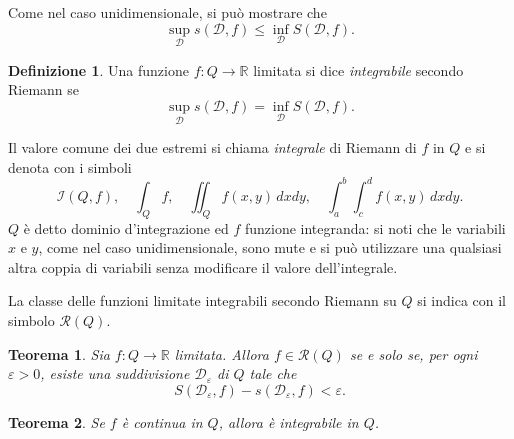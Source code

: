 \documentclass[a4paper]{book}
\numberwithin{equation}{section}
\renewcommand{\epsilon}{\varepsilon}
\theoremstyle{plain}
\newtheorem{teor}{Teorema}[section]
\theoremstyle{definition}
\newtheorem{defn}{Definizione}[section]
\theoremstyle{remark}
\theoremstyle{example}
\begin{document}
Come nel caso unidimensionale, si può mostrare che
	\begin{equation*}
	\sup_{\mathcal{D}} s(\mathcal{D}, f) \le \inf_{\mathcal{D}} S(\mathcal{D}, f).
	\end{equation*}

\begin{defn}
Una funzione $f \colon Q \to \mathbb{R}$ limitata si dice \emph{integrabile} secondo Riemann se
	\begin{equation*}
	\sup_{\mathcal{D}} s(\mathcal{D}, f) = \inf_{\mathcal{D}} S(\mathcal{D}, f).
	\end{equation*}
\end{defn}

Il valore comune dei due estremi si chiama \emph{integrale} di Riemann di $f$ in $Q$ e si denota con i simboli
	\begin{equation*}
	\mathcal{I}(Q, f), \quad \int_Q f, \quad \iint_Q f(x,y)\, dxdy, \quad \int_a^b \int_c^d f(x,y) \, dxdy.
	\end{equation*}
$Q$ è detto dominio d'integrazione ed $f$ funzione integranda: si noti che le variabili $x$ e $y$, come nel caso unidimensionale, sono mute e si può utilizzare una qualsiasi altra coppia di variabili senza modificare il valore dell'integrale.

La classe delle funzioni limitate integrabili secondo Riemann su $Q$ si indica con il simbolo $\mathcal{R}(Q)$.

\begin{teor}
Sia $f \colon Q \to \mathbb{R}$ limitata. Allora $f \in \mathcal{R}(Q)$ se e solo se, per ogni $\epsilon > 0$, esiste una suddivisione $\mathcal{D}_{\epsilon}$ di $Q$ tale che
	\begin{equation}
	S(\mathcal{D}_{\epsilon}, f) - s(\mathcal{D}_{\epsilon}, f) < \epsilon.
	\end{equation}
\end{teor}

\begin{teor}
Se $f$ è continua in $Q$, allora è integrabile in $Q$.
\end{teor}
\end{document}
